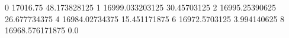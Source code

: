 0 17016.75 48.173828125
1 16999.033203125 30.45703125
2 16995.25390625 26.677734375
4 16984.02734375 15.451171875
6 16972.5703125 3.994140625
8 16968.576171875 0.0
